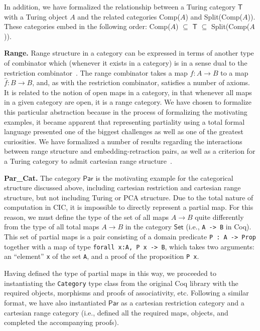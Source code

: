 \documentclass{entcs} \usepackage{entcsmacro}
\begin{document}
In addition, we have formalized the relationship between a Turing category $\mathsf{T}$ with a Turing object $A$ and the related categories Comp($A$) and Split(Comp($A$)). These categories embed in the following order:
Comp($A$) $\subseteq$ $\mathsf{T}$ $\subseteq$ Split(Comp($A$)).

{\bfseries Range.} Range structure in a category can be expressed in terms of another type of combinator which (whenever it exists in a category) is in a sense dual to the restriction combinator~\cite{RangeI}. The range combinator takes a map $f : A \to B$ to a map $\hat{f} : B \to B$, and, as with the restriction combinator, satisfies a number of axioms. It is related to the notion of open maps in a category, in that whenever all maps in a given category are open, it is a range category. We have chosen to formalize this particular abstraction because in the process of formalizing the motivating examples, %
it became apparent that representing partiality using a total formal language presented one of the biggest challenges as well as one of the greatest curiosities. We have formalized a number of results regarding the interactions between range structure and embedding-retraction pairs, as well as a criterion for a Turing category to admit cartesian range structure~\cite{MyThesis}.

{\bfseries Par\_Cat.} The category $\mathsf{Par}$ is the motivating example for the categorical structure discussed above, including cartesian restriction and cartesian range structure, but not including Turing or PCA structure. Due to the total nature of computation in CIC, it is impossible to directly represent a partial map. For this reason, we must define the type of the set of all maps $A \to B$ quite differently from the type of all total maps $A \to B$ in the category $\mathsf{Set}$ (i.e., {\tt A -> B} in Coq). This set of partial maps is a pair consisting of a domain predicate {\tt P : A -> Prop} together with a map of type {\tt forall x:A, P x -> B}, which takes two arguments: an ``element'' {\tt x} of the set {\tt A}, and a proof of the proposition {\tt P x}. 

Having defined the type of partial maps in this way, we proceeded to instantiating the {\tt Category} type class from the original Coq library with the required objects, morphisms and proofs of associativity, etc. Following a similar format, we have also instantiated $\mathsf{Par}$ as a cartesian restriction category and a cartesian range category (i.e., defined all the required maps, objects, and completed the accompanying proofs).
\end{document}
